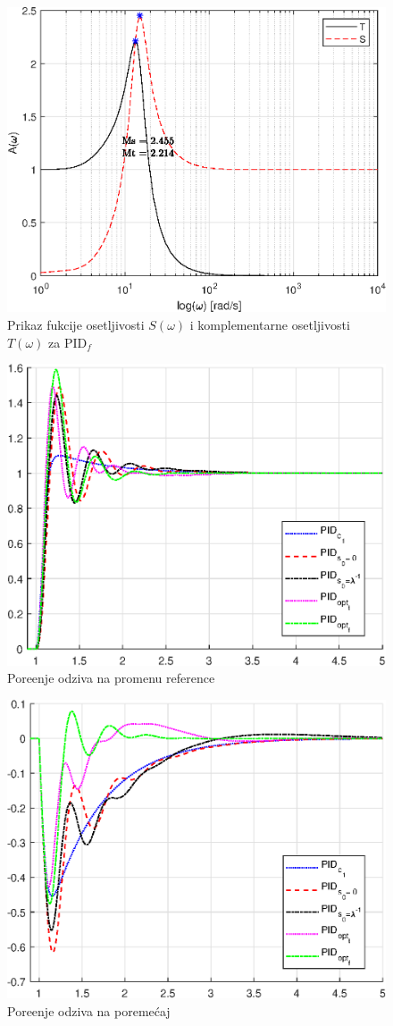 \documentclass[a4paper,11pt]{article}
\theoremstyle{definition} \newtheorem{deff}{Definicija}[section]
\theoremstyle{definition} \newtheorem{prim}[deff]{Primer}
\theoremstyle{plain} \newtheorem{teor}[deff]{Teorema}
\begin{document}
	\begin{figure}[!h]
		\centering
		\includegraphics[width=0.6\linewidth]{slike/Ms_Mt_pid_optf.eps}
		\caption{Prikaz fukcije osetljivosti $S(\omega)$ i komplementarne osetljivosti $T(\omega)$ za PID$_{f}$}
		\label{fig:MsMt_pid_optf}
	\end{figure}
	\clearpage
	
	\begin{figure}[!h]
		\centering
		\includegraphics[width=0.6\linewidth]{slike/Pg_comparison_default.eps}
		\caption{Pore\dj{}enje odziva na promenu reference}
		\label{fig:Pg_default}
	\end{figure}
	
	\begin{figure}[!h]
		\centering
		\includegraphics[width=0.6\linewidth]{slike/fm_comparison_default.eps}
		\caption{Pore\dj{}enje odziva na poreme\'caj}
		\label{fig:fm_default}
	\end{figure}
	
\end{document}
